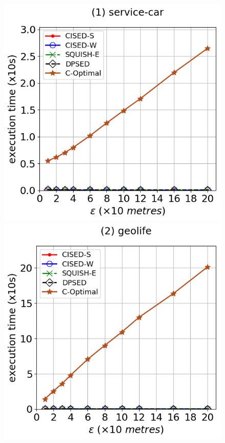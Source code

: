 {\begin{figure}[tb!]
\centering
\includegraphics[scale = 0.290]{Figures/Exp-opt-time-epsilon-service.png}\hspace{1ex}
\includegraphics[scale = 0.290]{Figures/Exp-opt-time-epsilon-geolife.png}\hspace{1ex}

\end{figure}}
